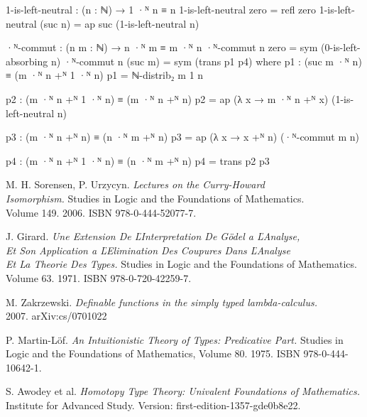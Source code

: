 \documentclass{article}[12pt]
\begin{document}
\begin{code}
1-is-left-neutral : (n : ℕ) → 1 ·ᴺ n ≡ n
1-is-left-neutral zero = refl zero
1-is-left-neutral (suc n) = ap suc (1-is-left-neutral n)

·ᴺ-commut : (n m : ℕ) → n ·ᴺ m ≡ m ·ᴺ n
·ᴺ-commut n zero = sym (0-is-left-absorbing n)
·ᴺ-commut n (suc m) = sym (trans p1 p4)
    where
        p1 : (suc m ·ᴺ n) ≡ (m ·ᴺ n +ᴺ 1 ·ᴺ n)
        p1 = ℕ-distrib₂ m 1 n

        p2 : (m ·ᴺ n +ᴺ 1 ·ᴺ n) ≡ (m ·ᴺ n +ᴺ n)
        p2 = ap (λ x → m ·ᴺ n +ᴺ x) (1-is-left-neutral n)

        p3 : (m ·ᴺ n +ᴺ n) ≡ (n ·ᴺ m +ᴺ n)
        p3 = ap (λ x → x +ᴺ n) (·ᴺ-commut m n)

        p4 : (m ·ᴺ n +ᴺ 1 ·ᴺ n) ≡ (n ·ᴺ m +ᴺ n)
        p4 = trans p2 p3
\end{code}

\begin{thebibliography}{}
    M. H. Sorensen, P. Urzycyn. \textit{Lectures on the Curry-Howard \\ Isomorphism.}
    Studies in Logic and the Foundations of Mathematics. \\ Volume 149. 2006. ISBN
    978-0-444-52077-7.

    J. Girard. \textit{Une Extension De ĽInterpretation De Gödel a ĽAnalyse, \\ Et Son Application  a ĽElimination Des Coupures Dans ĽAnalyse  \\ Et La Theorie Des Types.}
    Studies in Logic and the Foundations of Mathematics. Volume 63. 1971. ISBN 978-0-720-42259-7.

    M. Zakrzewski. \textit{Definable functions in the simply typed lambda-calculus.} \\ 2007.
    arXiv:cs/0701022
    
    P. Martin-Löf. \textit{An Intuitionistic Theory of Types: Predicative Part.} Studies in Logic and the Foundations of Mathematics,
    Volume 80. 1975. ISBN 978-0-444-10642-1.

    S. Awodey et al. \textit{Homotopy Type Theory: Univalent Foundations of Mathematics.} Institute for Advanced Study.
    Version: first-edition-1357-gde0b8e22.
\end{thebibliography}
\end{document}
